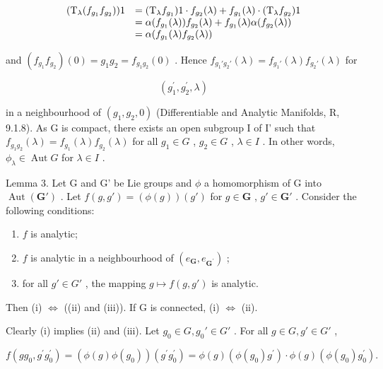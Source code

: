 \[
\begin{array}{r l} (\mathrm{T} _ {\lambda} (f _ {g _ {1}} f _ {g _ {2}})) 1 & = (\mathrm{T} _ {\lambda} f _ {g _ {1}}) 1 \cdot f _ {g _ {2}} (\lambda) + f _ {g _ {1}} (\lambda) \cdot (\mathrm{T} _ {\lambda} f _ {g _ {2}}) 1 \\ & = \alpha (f _ {g _ {1}} (\lambda)) f _ {g _ {2}} (\lambda) + f _ {g _ {1}} (\lambda) \alpha (f _ {g _ {2}} (\lambda)) \\ & = \alpha (f _ {g _ {1}} (\lambda) f _ {g _ {2}} (\lambda)) \end{array}
\]

and \((f_{g_1}f_{g_2})(0) = g_1g_2 = f_{g_1g_2}(0)\) . Hence \(f_{g_1'g_2'}(\lambda) = f_{g_1'}(\lambda)f_{g_2'}(\lambda)\) for

\[
(g _ {1} ^ {\prime}, g _ {2} ^ {\prime}, \lambda)
\]

in a neighbourhood of \((g_1, g_2, 0)\) (Differentiable and Analytic Manifolds, R, 9.1.8). As G is compact, there exists an open subgroup I of I' such that \(f_{g_1 g_2}(\lambda) = f_{g_1}(\lambda) f_{g_2}(\lambda)\) for all \(g_1 \in G\) , \(g_2 \in G\) , \(\lambda \in I\) . In other words, \(\phi_\lambda \in \operatorname{Aut} G\) for \(\lambda \in I\) .

Lemma 3. Let G and G' be Lie groups and \(\phi\) a homomorphism of G into \(\operatorname{Aut}(\mathbf{G}')\) . Let \(f(g, g') = (\phi(g))(g')\) for \(g \in \mathbf{G}\) , \(g' \in \mathbf{G}'\) . Consider the following conditions:

\begin{enumerate}
\def\labelenumi{(\roman{enumi})}
\item
  \(f\) is analytic;
\item
  \(f\) is analytic in a neighbourhood of \((e_{\mathbf{G}}, e_{\mathbf{G}^{\prime}})\) ;
\item
  for all \(g' \in G'\) , the mapping \(g \mapsto f(g, g')\) is analytic.
\end{enumerate}

Then (i) \(\Leftrightarrow\) ((ii) and (iii)). If G is connected, (i) \(\Leftrightarrow\) (ii).

Clearly (i) implies (ii) and (iii). Let \(g_0 \in G, g_0' \in G'\) . For all \(g \in G, g' \in G'\) ,

\[
f \left(g g _ {0}, g ^ {\prime} g _ {0} ^ {\prime}\right) = (\phi (g) \phi (g _ {0})) \left(g ^ {\prime} g _ {0} ^ {\prime}\right) = \phi (g) \left(\phi (g _ {0}) g ^ {\prime}\right)\cdot \phi (g) \left(\phi (g _ {0}) g _ {0} ^ {\prime}\right).
\]


